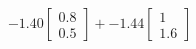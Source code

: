 \documentclass[preview]{standalone}
\begin{document}
\begin{align*}
-1.40 \begin{bmatrix} 0.8 \\ 0.5 \end{bmatrix} + -1.44 \begin{bmatrix} 1 \\ 1.6 \end{bmatrix}
\end{align*}
\end{document}
